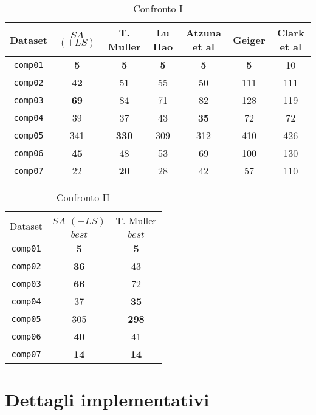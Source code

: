\documentclass[]{article}
\begin{document}
\begin{table}[h]
	\caption{Confronto I}
	\label{tab:inter-avg-results} 
	\small
	\begin{center}
		\begin{tabular}{| c | c c c c c c |}
			\hline
			Dataset & $SA$ $(+LS)$ & T. Muller & Lu Hao & Atzuna et al &Geiger & Clark et al \\
			\hline
			\texttt{comp01} & \textbf{5} &  \textbf{5} & \textbf{5} & \textbf{5 }& \textbf{5} & 10\\
			\texttt{comp02} &\textbf{42} & 51 &55 & 50& 111&111 \\
			\texttt{comp03} &\textbf{69}& 84 &71 & 82& 128&119 \\
			\texttt{comp04} & 39&  37&43 & \textbf{35}& 72& 72\\
			\texttt{comp05} & 341 &  \textbf{330}& 309&312 & 410 & 426 \\
			\texttt{comp06} &\textbf{45} & 48& 53& 69&100 & 130 \\
			\texttt{comp07} &22 & \textbf{20} & 28&42 &57 & 110\\
			\hline
		\end{tabular}
	\end{center}
\end{table}


\begin{table}[h]
	\caption{\label{tab:inter-best-results} Confronto  II}
	\small
	\begin{center}
		\begin{tabular}{| c | c c |}
			\hline
			\multirow{2}{*}{Dataset} & $SA$ $(+LS)$ & T. Muller \cite{bib:muller} \\
			& $best$ & $best$ \\
			\hline
			\texttt{comp01} & \textbf{5}& \textbf{5}\\
			\texttt{comp02} & \textbf{36}& 43\\
			\texttt{comp03} & \textbf{66} & 72\\
			\texttt{comp04} & 37& \textbf{35}\\
			\texttt{comp05} & 305& \textbf{298}\\
			\texttt{comp06} & \textbf{40}& 41 \\
			\texttt{comp07} &\textbf{14}& \textbf{14}\\
			\hline
		\end{tabular}
	\end{center}
\end{table}

\section{Dettagli implementativi}
\end{document}
